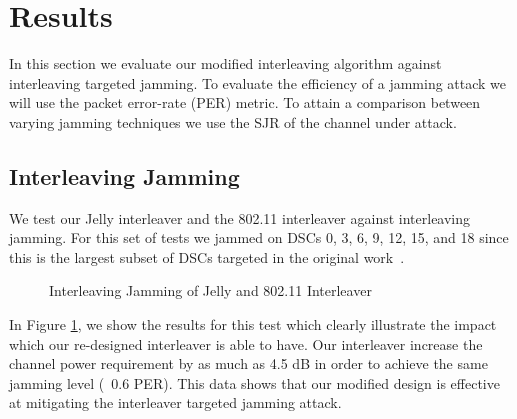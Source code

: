 \documentclass[sigconf, anonymous]{acmart}
\begin{document}
\section{Results}
\label{sec:results}

In this section we evaluate our modified interleaving algorithm against interleaving targeted jamming. To evaluate the efficiency of a jamming attack we will use the packet error-rate (PER) metric. To attain a comparison between varying jamming techniques we use the SJR of the channel under attack.  

\subsection{Interleaving Jamming}

We test our Jelly interleaver and the 802.11 interleaver against interleaving jamming. For this set of tests we jammed on DSCs 0, 3, 6, 9, 12, 15, and 18 since this is the largest subset of DSCs targeted in the original work~\cite{vo2016interleaving}. 

\begin{figure}[ht]
    \centering
    
    
    \caption{Interleaving Jamming of Jelly and 802.11 Interleaver}
    \label{fig:interleaving_jamming}
\end{figure}

In Figure \ref{fig:interleaving_jamming}, we show the results for this test which clearly illustrate the impact which our re-designed interleaver is able to have. Our interleaver increase the channel power requirement by as much as 4.5 dB in order to achieve the same jamming level (~0.6 PER). This data shows that our modified design is effective at mitigating the interleaver targeted jamming attack. 
\end{document}

